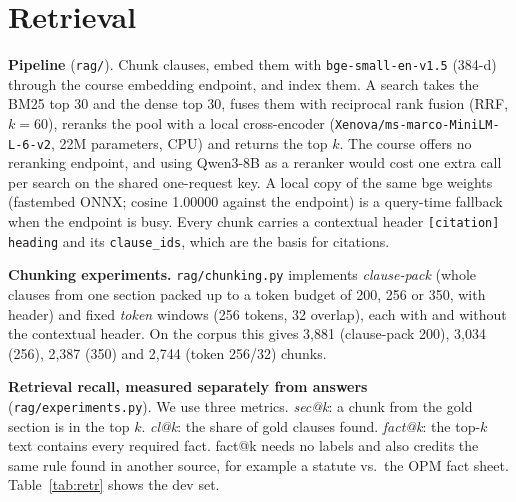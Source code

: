 \section{Retrieval}
\label{sec:rag}
\textbf{Pipeline} (\texttt{rag/}). Chunk clauses, embed them with \texttt{bge-small-en-v1.5} (384-d) through the
course embedding endpoint, and index them. A search takes the BM25 top 30 and the dense top 30, fuses them with
reciprocal rank fusion (RRF, $k{=}60$), reranks the pool with a local cross-encoder
(\texttt{Xenova/ms-marco-MiniLM-L-6-v2}, 22M parameters, CPU) and returns the top $k$. The course offers no
reranking endpoint, and using Qwen3-8B as a reranker would cost one extra call per search on the shared
one-request key. A local copy of the same bge weights (fastembed ONNX; cosine 1.00000 against the endpoint) is a
query-time fallback when the endpoint is busy. Every chunk carries a contextual header \texttt{[citation] heading}
and its \texttt{clause\_ids}, which are the basis for citations.

\textbf{Chunking experiments.} \texttt{rag/chunking.py} implements \emph{clause-pack} (whole clauses from one
section packed up to a token budget of 200, 256 or 350, with header) and fixed \emph{token} windows (256 tokens,
32 overlap), each with and without the contextual header. On the corpus this gives 3,881 (clause-pack 200), 3,034
(256), 2,387 (350) and 2,744 (token 256/32) chunks.

\textbf{Retrieval recall, measured separately from answers} (\texttt{rag/experiments.py}). We use three metrics.
\emph{sec@k}: a chunk from the gold section is in the top $k$. \emph{cl@k}: the share of gold clauses found.
\emph{fact@k}: the top-$k$ text contains every required fact. fact@k needs no labels and also credits the same rule
found in another source, for example a statute vs.\ the OPM fact sheet. Table~\ref{tab:retr} shows the dev set.

